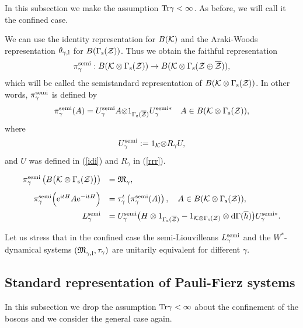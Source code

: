 \documentclass{svmult}
\def\bet{\begin{theorem}}
\def\eet{\end{theorem}}
\def\PF{{}}
\def\semi{{\rm semi}}
\def\bar{\overline}
\def\l{{\rm l}}
\def\s{{\rm s}}
\def\cZ{{\cal Z}}
\def\fM{{\mathfrak M}}
\def\i{{\rm i}}
\def\Tr{{\rm Tr}}
\def\e{{\rm e}}
\def\d{{\rm d}}
\def\l{{\rm l}}
\def\Tr{{\rm Tr}}
\def\cK{{\cal K}}
\def\e{{\rm e}}
\def\d{{\rm d}}
\def\s{{\rm s}}
\begin{document}
\begin{remark}
In this subsection we make the assumption $\Tr\gamma<\infty$. As before, 
we will call it the confined case.

We can use the identity representation for $B(\cK)$ and the
Araki-Woods representation $\theta_{\gamma,\l}$ 
for $B(\Gamma_\s(\cZ))$. Thus we
obtain the faithful  representation
\[\pi_{\gamma}^{\semi}
 :B(\cK\otimes 
\Gamma_\s(\cZ))\to B(\cK\otimes\Gamma_\s(\cZ\oplus\bar\cZ)),\] 
which will be called the semistandard representation of 
$B(\cK\otimes 
\Gamma_\s(\cZ))$.
In other words, $\pi_{\gamma}^\semi$ is defined by 
\[\pi_{\gamma}^\semi(A)=
U_{\gamma}^\semi
A{\otimes} 1_{\Gamma_\s(\bar\cZ)}
U_{\gamma}^{\semi*}
\ \ \ A\in B(\cK\otimes\Gamma_\s(\cZ)),\]
where\[U_{\gamma}^\semi:=
1_\cK{\otimes} R_\gamma U,\]
and $U$ was defined in (\ref{idi}) and $R_\gamma$ in (\ref{rrr}).






\bet
\[\begin{array}{rl}
\pi_{\gamma}^{\semi}
\left(B\bigr(\cK\otimes \Gamma_\s(\cZ)\bigr)\right)&= \fM_{\gamma}^\PF,\\[3mm]
 \pi_{\gamma}^{\semi}\Big(\e^{\i tH}A\e^{-\i
tH}\Big)&=\tau_\gamma^t\left(\pi_{\gamma}^{\semi}(A)\right)
,\ \ \ A\in B(\cK\otimes\Gamma_\s(\cZ)),\\[3mm]
L_\gamma^\semi&=U_{\gamma}^\semi
\bigl(H\otimes
1_{\Gamma_\s(\bar\cZ)}-  
1_{\cK\otimes\Gamma_\s(\cZ)}\otimes\d\Gamma(\bar h)\bigr)
U_{\gamma}^{\semi*}
.\end{array}\]
\eet

 Let us stress that in the confined case the semi-Liouvilleans 
$L_\gamma^\semi$ and the $W^*$-dynamical systems
$(\fM_{\gamma,\l}^\PF,\tau_\gamma)$  are unitarily equivalent for
 different $\gamma$.


\subsection{Standard  representation of Pauli-Fierz systems}
\label{s5.4b}

In this subsection we drop the assumption $\Tr\gamma<\infty$
 about the confinement of
the bosons and we consider the general case again.


\end{remark}
\end{document}
